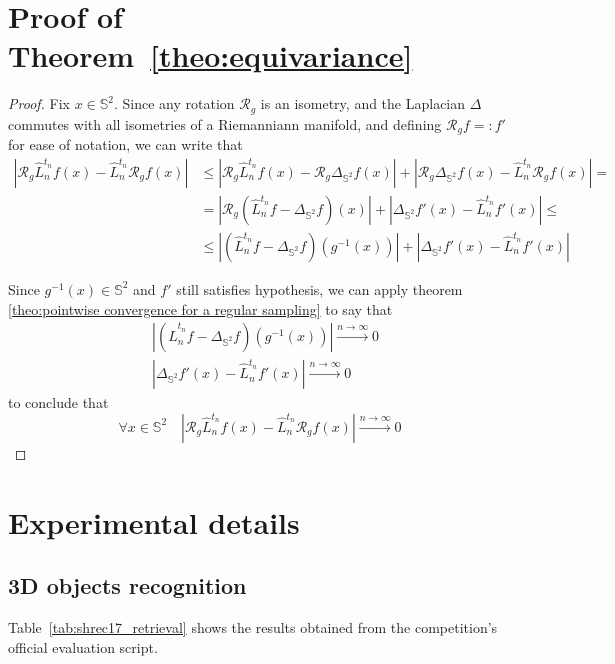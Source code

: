 \documentclass{article} %
\newcommand{\laplacian}{\Delta_{\mathbb S^2}}
\newcommand{\Rg}{\mathcal R_g}
\newcommand{\seminorm}[1]{\left|#1\right|}
\newcommand{\Ln}{\hat L_n^{t_n}}
\newcommand{\Tabref}[1]{Table~\ref{tab:#1}}
\begin{document}
\section{Proof of Theorem~\ref{theo:equivariance}}
\begin{proof}
Fix $x\in \mathbb S^2$. Since any rotation $\mathcal R_g$ is an isometry, and the Laplacian $\Delta$ commutes with all isometries of a Riemanniann manifold, and defining $\mathcal R_g f =: f'$ for ease of notation, we can write that
	\begin{align*}
			\seminorm{\Rg \Ln f (x) - \Ln \Rg f(x) } &\leq \seminorm{\Rg \Ln f (x) - \Rg \laplacian f(x)} + \seminorm{\Rg \laplacian f (x) - \Ln \Rg f(x)} =\\
			& =\seminorm{\Rg (\Ln f - \laplacian f ) (x)} + \seminorm{ \laplacian f' (x) - \Ln f'(x)} \leq \\
			& \leq \seminorm{(\Ln f - \laplacian f ) (g^{-1}(x))} + \seminorm{ \laplacian f' (x) - \Ln f'(x)}
	\end{align*}

Since $g^{-1}(x)\in\mathbb{S}^2$ and $f'$ still satisfies hypothesis, we can apply theorem \ref{theo:pointwise convergence for a regular sampling} to say that
\begin{align*}
 &\seminorm{(\Ln f - \laplacian f ) (g^{-1}(x))} \xrightarrow{n\to\infty}0\\
  &\seminorm{ \laplacian f' (x) - \Ln f'(x)}\xrightarrow{n\to\infty}0
\end{align*}
to conclude that $$\forall x\in\mathbb S^2 \quad\seminorm{\Rg \Ln f (x) - \Ln \Rg f(x) } \xrightarrow{n\to\infty}0$$

\end{proof}


\section{Experimental details}

\subsection{3D objects recognition}

\Tabref{shrec17_retrieval} shows the results obtained from the competition's official evaluation script.
\end{document}
